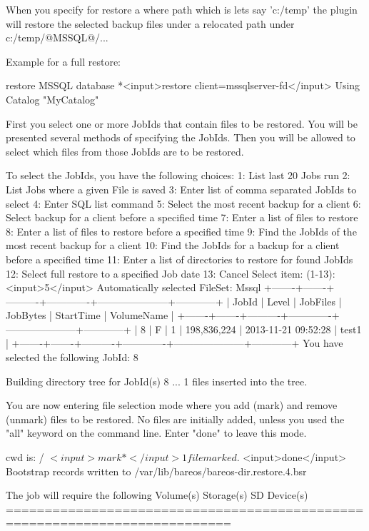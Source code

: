 When you specify for restore a where path which is lets say 'c:/temp' the plugin will restore
the selected backup files under a relocated path under c:/temp/@MSSQL@/...

Example for a full restore:

\begin{bconsole}{restore MSSQL database}
*<input>restore client=mssqlserver-fd</input>
Using Catalog "MyCatalog"

First you select one or more JobIds that contain files
to be restored. You will be presented several methods
of specifying the JobIds. Then you will be allowed to
select which files from those JobIds are to be restored.

To select the JobIds, you have the following choices:
     1: List last 20 Jobs run
     2: List Jobs where a given File is saved
     3: Enter list of comma separated JobIds to select
     4: Enter SQL list command
     5: Select the most recent backup for a client
     6: Select backup for a client before a specified time
     7: Enter a list of files to restore
     8: Enter a list of files to restore before a specified time
     9: Find the JobIds of the most recent backup for a client
    10: Find the JobIds for a backup for a client before a specified time
    11: Enter a list of directories to restore for found JobIds
    12: Select full restore to a specified Job date
    13: Cancel
Select item:  (1-13): <input>5</input>
Automatically selected FileSet: Mssql
+-------+-------+----------+-------------+---------------------+------------+
| JobId | Level | JobFiles | JobBytes    | StartTime           | VolumeName |
+-------+-------+----------+-------------+---------------------+------------+
|     8 | F     |        1 | 198,836,224 | 2013-11-21 09:52:28 | test1      |
+-------+-------+----------+-------------+---------------------+------------+
You have selected the following JobId: 8

Building directory tree for JobId(s) 8 ...
1 files inserted into the tree.

You are now entering file selection mode where you add (mark) and
remove (unmark) files to be restored. No files are initially added, unless
you used the "all" keyword on the command line.
Enter "done" to leave this mode.

cwd is: /
$ <input>mark *</input>
1 file marked.
$ <input>done</input>
Bootstrap records written to /var/lib/bareos/bareos-dir.restore.4.bsr

The job will require the following
   Volume(s)                 Storage(s)                SD Device(s)
===========================================================================


\end{bconsole}
